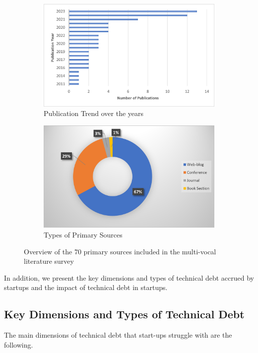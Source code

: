 \begin{figure}[h!]
  \begin{subfigure}[b]{0.45\linewidth}
	\centering
	\includegraphics[width=\linewidth]{PublicationTrend.jpg}
	\caption{Publication Trend over the years}
	\label{fig:Trend}
  \end{subfigure}
\hfill
  \begin{subfigure}[b]{0.45\linewidth}
	\centering
	\includegraphics[width=\linewidth]{TypeSources.jpg}
	\caption{Types of Primary Sources}
	\label{fig:Sources}
  \end{subfigure}
  \label{fig:Overview}
  \caption{Overview of the 70 primary sources included in the multi-vocal literature survey}
\end{figure}


In addition, we present the key dimensions and types of technical debt accrued by startups and the impact of technical debt in startups.
\subsection*{Key Dimensions and Types of Technical Debt}
\label{sec:dimensions}
The main dimensions of technical debt that start-ups struggle with are the following.

